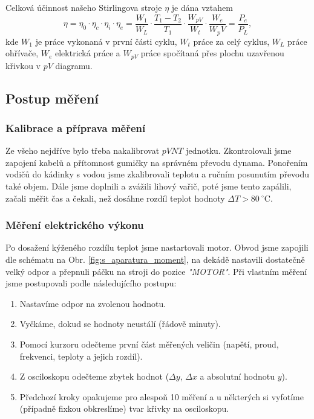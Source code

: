 \documentclass[english]{article}
\newcommand{\unit}[1]{\mathrm{#1}}
\begin{document}
	Celková účinnost našeho Stirlingova stroje $\eta$ je dána vztahem
	\begin{equation}
	\eta = \eta_0 \cdot \eta_c \cdot \eta_i \cdot \eta_e = \frac{W_1}{W_L} \cdot \frac{T_1-T_2}{T_1} \cdot \frac{W_{pV}}{W_t} \cdot \frac{W_e}{W_pV} = \frac{P_e}{P_L},
	\end{equation}
	kde $W_1$ je práce vykonaná v první části cyklu, $W_t$ práce za celý cyklus, $W_L$ práce ohřívače, $W_e$ elektrická práce a $W_{pV}$ práce spočítaná přes plochu uzavřenou křivkou v $pV$ diagramu.
		
\subsection{Postup měření}
	\subsubsection{Kalibrace a příprava měření}
		Ze všeho nejdříve bylo třeba nakalibrovat $pVNT$ jednotku. Zkontrolovali jsme zapojení kabelů a přítomnost gumičky na správném převodu dynama. Ponořením vodičů do kádinky s vodou jsme zkalibrovali teplotu a ručním posunutím převodu také objem. Dále jsme doplnili a zvážili lihový vařič, poté jsme tento zapálili, začali měřit čas a čekali, než dosáhne rozdíl teplot hodnoty $\Delta T > 80\ ^\circ\unit{C}$.
		
	\subsubsection{Měření elektrického výkonu}
		Po dosažení kýženého rozdílu teplot jsme nastartovali motor. Obvod jsme zapojili dle schématu na Obr. \ref{fig:s_aparatura_moment}, na dekádě nastavili dostatečně velký odpor a přepnuli páčku na stroji do pozice \emph{"MOTOR"}. Při vlastním měření jsme postupovali podle následujícího postupu:
		\begin{enumerate}
			\item Nastavíme odpor na zvolenou hodnotu.
			\item Vyčkáme, dokud se hodnoty neustálí (řádově minuty).
			\item Pomocí kurzoru odečteme první část měřených veličin (napětí, proud, frekvenci, teploty a jejich rozdíl).
			\item Z osciloskopu odečteme zbytek hodnot ($\Delta y$, $\Delta x$ a absolutní hodnotu $y$).
			\item Předchozí kroky opakujeme pro alespoň 10 měření a u některých si vyfotíme (případně fixkou obkreslíme) tvar křivky na osciloskopu.
		\end{enumerate}
		
\end{document}
